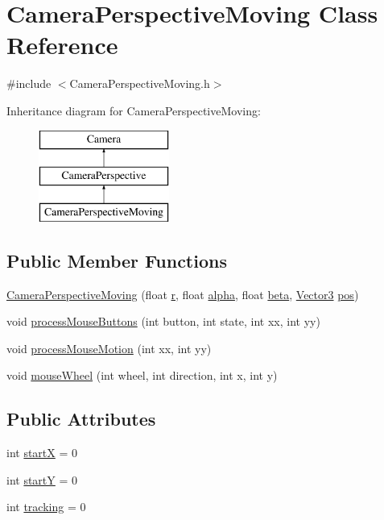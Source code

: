 \hypertarget{class_camera_perspective_moving}{}\section{Camera\+Perspective\+Moving Class Reference}
\label{class_camera_perspective_moving}


{\ttfamily \#include $<$Camera\+Perspective\+Moving.\+h$>$}

Inheritance diagram for Camera\+Perspective\+Moving\+:\begin{figure}[H]
\begin{center}
\leavevmode
\includegraphics[height=3.000000cm]{class_camera_perspective_moving}
\end{center}
\end{figure}
\subsection*{Public Member Functions}
\begin{DoxyCompactItemize}
\item 
\hyperlink{class_camera_perspective_moving_a61a3b32e7c149c9aa7091303f831d6c1}{Camera\+Perspective\+Moving} (float \hyperlink{class_camera_perspective_adb49aa14a62f537f810038351b141a36}{r}, float \hyperlink{class_camera_perspective_a93009a48069d0d671317c5d9f7d66963}{alpha}, float \hyperlink{class_camera_perspective_a3545402762e444abd3cb90ea9d2e72ca}{beta}, \hyperlink{class_vector3}{Vector3} \hyperlink{class_camera_a2c4c5bcf8f5885968d4e5ebc28074846}{pos})
\item 
void \hyperlink{class_camera_perspective_moving_ace1cd58845d0122e284a5ebecb2528ce}{process\+Mouse\+Buttons} (int button, int state, int xx, int yy)
\item 
void \hyperlink{class_camera_perspective_moving_aacc461e1ac1912f0aefdeafcf04ccdbf}{process\+Mouse\+Motion} (int xx, int yy)
\item 
void \hyperlink{class_camera_perspective_moving_a7feb0b10588b45d72c894b1366da5811}{mouse\+Wheel} (int wheel, int direction, int x, int y)
\end{DoxyCompactItemize}
\subsection*{Public Attributes}
\begin{DoxyCompactItemize}
\item 
int \hyperlink{class_camera_perspective_moving_a69b3b2a9640c959b047efe17baea370c}{startX} = 0
\item 
int \hyperlink{class_camera_perspective_moving_a8a18360e9a24f78c32fd5e7d667a24e4}{startY} = 0
\item 
int \hyperlink{class_camera_perspective_moving_acf09c3044b76990c814adc466471a571}{tracking} = 0
\end{DoxyCompactItemize}


